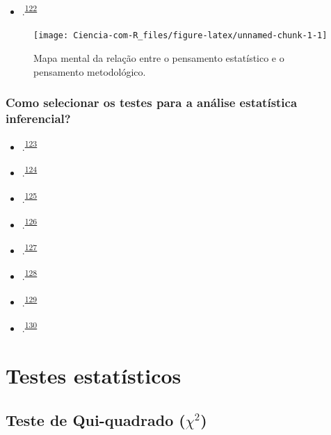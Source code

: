 \documentclass[
  a4paper,
]{book}
\providecommand{\tightlist}{%
  \setlength{\itemsep}{0pt}\setlength{\parskip}{0pt}}
\begin{document}
\begin{itemize}
\tightlist
\item
  .\textsuperscript{\protect\hyperlink{ref-munafuxf22017}{122}}
\end{itemize}

\begin{figure}

{\centering \texttt{[image: Ciencia-com-R\_files/figure-latex/unnamed-chunk-1-1]} 

}

\caption{Mapa mental da relação entre o pensamento estatístico e o pensamento metodológico.}\label{fig:unnamed-chunk-1}
\end{figure}

\hypertarget{como-selecionar-os-testes-para-a-anuxe1lise-estatuxedstica-inferencial}{%
\subsection{Como selecionar os testes para a análise estatística inferencial?}\label{como-selecionar-os-testes-para-a-anuxe1lise-estatuxedstica-inferencial}}

\begin{itemize}
\item
  .\textsuperscript{\protect\hyperlink{ref-dwivedi2019}{123}}
\item
  .\textsuperscript{\protect\hyperlink{ref-Dwivedi2022}{124}}
\item
  .\textsuperscript{\protect\hyperlink{ref-Kim2017}{125}}
\item
  .\textsuperscript{\protect\hyperlink{ref-marusteri2010}{126}}
\item
  .\textsuperscript{\protect\hyperlink{ref-mishra2019}{127}}
\item
  .\textsuperscript{\protect\hyperlink{ref-ray2021}{128}}
\item
  .\textsuperscript{\protect\hyperlink{ref-nayak2011}{129}}
\item
  .\textsuperscript{\protect\hyperlink{ref-shankar2014}{130}}
\end{itemize}

\hypertarget{testes-estatisticos}{%
\chapter{\texorpdfstring{\textbf{Testes estatísticos}}{Testes estatísticos}}\label{testes-estatisticos}}

\hypertarget{teste-de-qui-quadrado-chi2}{%
\section{\texorpdfstring{Teste de Qui-quadrado (\(\chi^2\))}{Teste de Qui-quadrado (\textbackslash chi\^{}2)}}\label{teste-de-qui-quadrado-chi2}}
\end{document}
